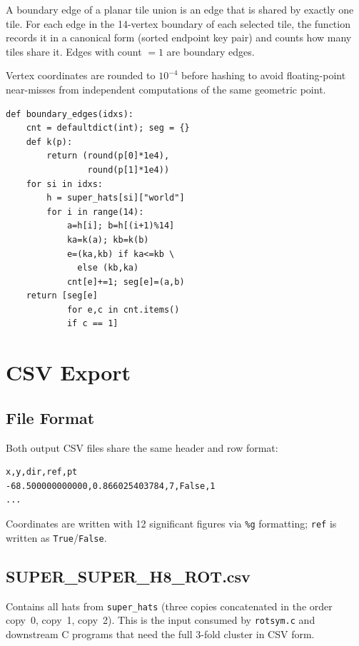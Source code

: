 \documentclass[10pt,a4paper]{article}
\let\polysection\section
\renewcommand\section{\needspace{0.16\textheight}\polysection}
\let\polysubsection\subsection
\renewcommand\subsection{\needspace{0.12\textheight}\polysubsection}
\newcommand{\code}[1]{\texttt{\small #1}}
\begin{document}
\begin{tcolorbox}[dualbox, title={\code{boundary\_edges(idxs)} — extract the boundary}]
  A boundary edge of a planar tile union is an edge that is shared by exactly
  one tile.  For each edge in the 14-vertex boundary of each selected tile,
  the function records it in a canonical form (sorted endpoint key pair) and
  counts how many tiles share it.  Edges with count $= 1$ are boundary edges.

  Vertex coordinates are rounded to $10^{-4}$ before hashing to avoid
  floating-point near-misses from independent computations of the same
  geometric point.
\tcblower
\begin{verbatim}
def boundary_edges(idxs):
    cnt = defaultdict(int); seg = {}
    def k(p):
        return (round(p[0]*1e4),
                round(p[1]*1e4))
    for si in idxs:
        h = super_hats[si]["world"]
        for i in range(14):
            a=h[i]; b=h[(i+1)%14]
            ka=k(a); kb=k(b)
            e=(ka,kb) if ka<=kb \
              else (kb,ka)
            cnt[e]+=1; seg[e]=(a,b)
    return [seg[e]
            for e,c in cnt.items()
            if c == 1]
\end{verbatim}
\end{tcolorbox}

\section{CSV Export}

\subsection{File Format}

Both output CSV files share the same header and row format:

\begin{verbatim}
x,y,dir,ref,pt
-68.500000000000,0.866025403784,7,False,1
...
\end{verbatim}

\noindent Coordinates are written with 12 significant figures via
\texttt{\%g} formatting; \code{ref} is written as \texttt{True}/\texttt{False}.

\subsection{SUPER\_SUPER\_H8\_ROT.csv}

Contains all hats from \code{super\_hats} (three copies concatenated in the
order copy~0, copy~1, copy~2).  This is the input consumed by
\code{rotsym.c} and downstream C programs that need the full 3-fold cluster
in CSV form.
\end{document}
